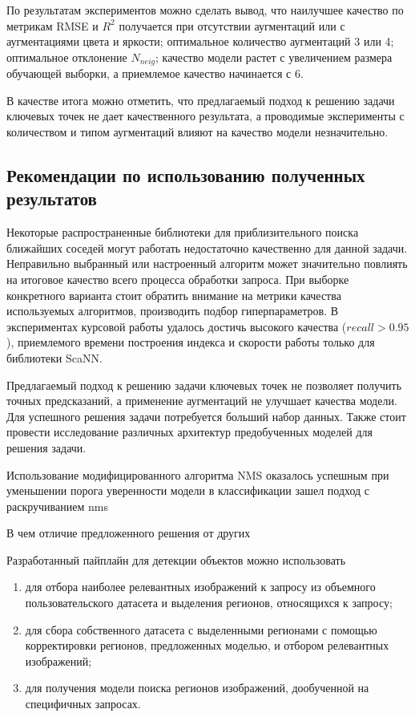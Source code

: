 \documentclass[a4paper,14pt]{article}
\begin{document}
    По результатам экспериментов можно сделать вывод, что наилучшее качество по метрикам RMSE и $R^2$ получается при отсутствии аугментаций или с аугментациями цвета и яркости; оптимальное количество аугментаций 3 или 4; оптимальное отклонение $N_{neig}$; качество модели растет с увеличением размера обучающей выборки, а приемлемое качество начинается с 6.
    
    В качестве итога можно отметить, что предлагаемый подход к решению задачи ключевых точек не дает качественного результата, а проводимые эксперименты с количеством и типом аугментаций влияют на качество модели незначительно.

    \subsection{Рекомендации по использованию полученных результатов}

    Некоторые распространенные библиотеки для приблизительного поиска ближайших соседей могут работать недостаточно качественно для данной задачи.
    Неправильно выбранный или настроенный алгоритм может значительно повлиять на итоговое качество всего процесса обработки запроса.
    При выборке конкретного варианта стоит обратить внимание на метрики качества используемых алгоритмов, производить подбор гиперпараметров.
    В экспериментах курсовой работы удалось достичь высокого качества ($recall > 0.95$), приемлемого времени построения индекса и скорости работы только для библиотеки ScaNN.

	Предлагаемый подход к решению задачи ключевых точек не позволяет получить точных предсказаний, а применение аугментаций не улучшает качества модели.
    Для успешного решения задачи потребуется больший набор данных.
    Также стоит провести исследование различных архитектур предобученных моделей для решения задачи.

	Использование модифицированного алгоритма NMS оказалось успешным при уменьшении порога уверенности модели в классификации
    зашел подход с раскручиванием nms
    
    В чем отличие предложенного решения от других

    Разработанный пайплайн для детекции объектов можно использовать
    \begin{enumerate}
        [1)]
        \itemsep0em
        \item для отбора наиболее релевантных изображений к запросу из объемного пользовательского датасета и выделения регионов, относящихся к запросу;
        \item для сбора собственного датасета с выделенными регионами с помощью корректировки регионов, предложенных моделью, и отбором релевантных изображений;
        \item для получения модели поиска регионов изображений, дообученной на специфичных запросах.
    \end{enumerate}
\end{document}
